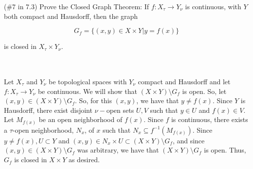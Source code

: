 (\#7 in 7.3) Prove the Closed Graph Theorem: If $f: X_{\tau} \to Y_{\nu}$ is continuous, with $Y$ both
compact and Hausdorff, then the graph

$$G_f = \{(x,y) \in X\times Y | y=f(x)\}$$

is closed in $X_{\tau}\times Y_{\nu}$.\\\\

\begin{solution}\renewcommand{\qedsymbol}{}\ \\
    Let $X_{\tau}$ and $Y_{\nu}$ be topological spaces with $Y_{\nu}$ compact and Hausdorff and let
    $f:X_{\tau}\rightarrow Y_{\nu}$ be continuous. We will show that $(X\times Y)\setminus G_f$ is open.
    So, let $(x,y)\in(X\times Y)\setminus G_f$. So, for this $(x,y)$, we have that $y\neq f(x)$. Since
    $Y$ is Hausdorff, there exist disjoint $\nu-$open sets $U,V$ such that $y\in U$ and $f(x)\in V$. Let
    $M_{f(x)}$ be an open neighborhood of $f(x)$. Since $f$ is continuous, there exists a $\tau$-open
    neighborhood, $N_x$, of $x$ such that $N_x\subseteq f^{-1}(M_{f(x)})$. Since
    $y\neq f(x), U\subset Y$ and $(x,y)\in N_x\times U\subset(X\times Y)\setminus G_f$, and since
    $(x,y)\in(X\times Y)\setminus G_f$ was arbitrary, we have that $(X\times Y)\setminus G_f$ is open.
    Thus, $G_f$ is closed in $X\times Y$ as desired.

\end{solution}